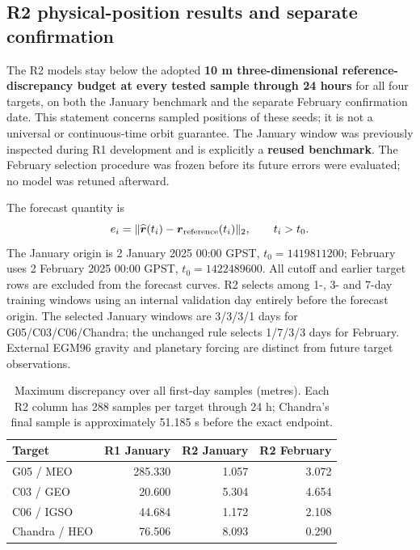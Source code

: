 \subsection{R2 physical-position results and separate confirmation}
\label{sec:orbit-validation}

The R2 models stay below the adopted \textbf{10 m three-dimensional
reference-discrepancy budget at every tested sample through 24 hours} for all
four targets, on both the January benchmark and the separate February
confirmation date. This statement concerns sampled positions of these seeds;
it is not a universal or continuous-time orbit guarantee.
The January window was previously inspected during R1 development and is
explicitly a \textbf{reused benchmark}. The February selection procedure was
frozen before its future errors were evaluated; no model was retuned afterward.

The forecast quantity is
\[
 e_i=\|\widehat{\boldsymbol r}(t_i)-\boldsymbol r_{\rm reference}(t_i)\|_2,
 \qquad t_i>t_0.
\]
The January origin is 2 January 2025 00:00 GPST,
$t_0=1419811200$; February uses 2 February 2025 00:00 GPST,
$t_0=1422489600$. All cutoff and earlier target rows are excluded from the
forecast curves. R2 selects among 1-, 3- and 7-day training windows using an
internal validation day entirely before the forecast origin. The selected
January windows are 3/3/3/1 days for G05/C03/C06/Chandra; the unchanged rule
selects 1/7/3/3 days for February. External EGM96 gravity and planetary forcing
are distinct from future target observations.

\begin{table}[htbp]
\centering\small
\caption{Maximum discrepancy over all first-day samples (metres). Each R2
column has 288 samples per target through 24 h; Chandra's final sample is
approximately 51.185 s before the exact endpoint.}
\label{tab:orbit-first-day-comparison}
\begin{tabular*}{\linewidth}{@{\extracolsep{\fill}}lrrr@{}}
\toprule
Target & R1 January & R2 January & R2 February\\
\midrule
G05 / MEO & 285.330 & 1.057 & 3.072\\
C03 / GEO & 20.600 & 5.304 & 4.654\\
C06 / IGSO & 44.684 & 1.172 & 2.108\\
Chandra / HEO & 76.506 & 8.093 & 0.290\\
\bottomrule
\end{tabular*}
\end{table}

